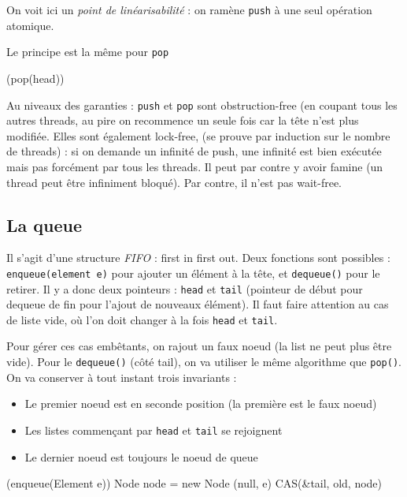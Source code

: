 \documentclass{article}
\begin{document}
On voit ici un \emph{point de linéarisabilité} : on ramène \texttt{push} à une seul opération atomique.

Le principe est la même pour \texttt{pop}


\begin{algorithm}[H]
\Void({pop(head)}){
}
\end{algorithm}

Au niveaux des garanties : \texttt{push} et \texttt{pop} sont obstruction-free (en coupant tous les autres threads, au pire on recommence un seule fois car la tête n'est plus modifiée. Elles sont également lock-free, (se prouve par induction sur le nombre de threads) : si on demande un infinité de push, une infinité est bien exécutée mais pas forcément par tous les threads. Il peut par contre y avoir famine (un thread peut être infiniment bloqué). Par contre, il n'est pas wait-free.


\subsection{La queue}
Il s'agit d'une structure \emph{FIFO} : first in first out. Deux fonctions sont possibles : \texttt{enqueue(element e)} pour ajouter un élément à la tête, et \texttt{dequeue()} pour le retirer. Il y a donc deux pointeurs : \texttt{head} et \texttt{tail} (pointeur de début pour dequeue de fin pour l'ajout de nouveaux élément). Il faut faire attention au cas de liste vide, où l'on doit changer à la fois \texttt{head} et \texttt{tail}.

Pour gérer ces cas embêtants, on rajout un faux noeud (la list ne peut plus être vide). Pour le \texttt{dequeue()} (côté tail), on va utiliser le même algorithme que \texttt{pop()}. On va conserver à tout instant trois invariants :
\begin{itemize}
\item Le premier noeud est en seconde position (la première est le faux noeud)
\item Les listes commençant par \texttt{head} et \texttt{tail} se rejoignent
\item Le dernier noeud est toujours le noeud de queue
\end{itemize}

\begin{algorithm}[H]
\Void({enqueue(Element e)}){
	Node node = new Node (null, e)\;
	CAS(\&tail, old, node)\;
}
\end{algorithm}
\end{document}
